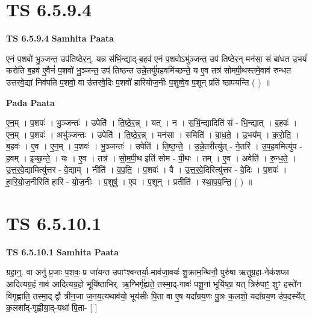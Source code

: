 \documentclass[17pt]{extarticle}
\begin{document}

\section{ TS 6.5.9.4 }

\textbf{TS 6.5.9.4 } \newline
\textbf{Samhita Paata} \newline

एनं प॒शवो॑ भु॒ञ्जन्त॒ उप॑तिष्ठेर॒न्॒. यन्न स॑भिं॒न्द्याद्-ब॒हव॑ एनं प॒शवोऽभु॑ञ्जन्त॒ उप॑ तिष्ठेर॒न् मन॑सा॒ सं बा॑धत उ॒भयं॑ करोति ब॒हव॑ ए॒वैनं॑ प॒शवो॑ भु॒ञ्जन्त॒ उप॑ तिष्ठन्त उन्ने॒तर्यु॑पह॒वमि॑च्छन्ते॒ य ए॒व तत्र॑ सोमपी॒थस्तमे॒वाव॑ रुन्धत उत्तरवे॒द्यां निव॑पति प॒शवो॒ वा उ॑त्तरवे॒दिः प॒शवो॑ हारियोज॒नीः प॒शुष्वे॒व प॒शून् प्रति॑ ष्ठापयन्ति ( ) ॥ \newline

\textbf{Pada Paata} \newline

ए॒न॒म् । प॒शवः॑ । भु॒ञ्जन्तः॑ । उपेति॑ । ति॒ष्ठे॒र॒न्न् । यत् । न । स॒भिं॒न्द्यादिति॑ सं - भि॒न्द्यात् । ब॒हवः॑ । ए॒न॒म् । प॒शवः॑ । अभु॑ञ्जन्तः । उपेति॑ । ति॒ष्ठे॒र॒न्न् । मन॑सा । समिति॑ । बा॒ध॒ते॒ । उ॒भय᳚म् । क॒रो॒ति॒ । ब॒हवः॑ । ए॒व । ए॒न॒म् । प॒शवः॑ । भु॒ञ्जन्तः॑ । उपेति॑ । ति॒ष्ठ॒न्ते॒ । उ॒न्ने॒तरीत्यु॑त् - ने॒तरि॑ । उ॒प॒ह॒वमित्यु॑प - ह॒वम् । इ॒च्छ॒न्ते॒ । यः । ए॒व । तत्र॑ । सो॒म॒पी॒थ इति॑ सोम - पी॒थः । तम् । ए॒व । अवेति॑ । रु॒न्ध॒ते॒ । उ॒त्त॒र॒वे॒द्यामित्यु॑त्तर - वे॒द्याम् । नीति॑ । व॒प॒ति॒ । प॒शवः॑ । वै । उ॒त्त॒र॒वे॒दिरित्यु॑त्तर - वे॒दिः । प॒शवः॑ । हा॒रि॒यो॒ज॒नीरिति॑ हारि - यो॒ज॒नीः । प॒शुषु॑ । ए॒व । प॒शून् । प्रतीति॑ । स्था॒प॒य॒न्ति॒ ( ) ॥  \newline





\section{ TS 6.5.10.1 }

\textbf{TS 6.5.10.1 } \newline
\textbf{Samhita Paata} \newline

ग्रहा॒न्॒. वा अनु॑ प्र॒जाः प॒शवः॒ प्र जा॑यन्त उपाꣳश्वन्तर्या॒-माव॑जा॒वयः॑ शु॒क्राम॒न्थिनौ॒ पुरु॑षा ऋतुग्र॒हा-नेक॑शफा आदित्यग्र॒हं गाव॑ आदित्यग्र॒हो भूयि॑ष्ठाभिर्. ऋ॒ग्भिर्गृ॑ह्यते॒ तस्मा॒द्-गावः॑ पशू॒नां भूयि॑ष्ठा॒ यत् त्रिरु॑पाꣳ॒॒ शुꣳ हस्ते॑न विगृ॒ह्णाति॒ तस्मा॒द् द्वौ त्रीन॒जा ज॒नय॒त्यथाव॑यो॒ भूय॑सीः पि॒ता वा ए॒ष यदा᳚ग्रय॒णः पु॒त्रः क॒लशो॒ यदा᳚ग्रय॒ण उ॑प॒दस्ये᳚त् क॒लशा᳚द्-गृह्णीया॒द्-यथा॑ पि॒ता- [  ] \newline
\end{document}
